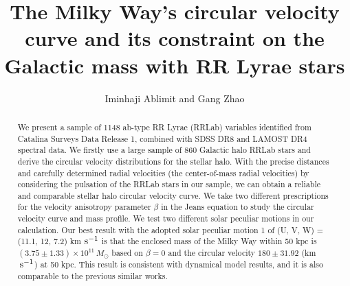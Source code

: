 \documentclass[12pt,preprint]{aastex}
\begin{document}


\title{ The Milky Way's circular velocity curve and its constraint
on the Galactic mass with RR Lyrae stars}
\author{Iminhaji Ablimit and Gang Zhao}



\begin{abstract}
We present a sample of 1148 ab-type RR Lyrae (RRLab) variables
identified from Catalina Surveys Data Release 1, combined with SDSS
DR8 and LAMOST DR4 spectral data. We firstly use a large sample of
860 Galactic halo RRLab stars and derive the circular velocity distributions for
the stellar halo. With the precise distances and carefully determined radial velocities
(the center-of-mass radial velocities) by considering the pulsation of the RRLab stars in our
sample, we can obtain a
reliable and comparable stellar halo circular velocity curve. We
take two different prescriptions for the velocity anisotropy parameter $\beta$
in the Jeans equation to study the circular velocity curve and mass profile. We test two different solar peculiar motions in our calculation. Our
best result with the adopted solar peculiar motion 1 of (U, V, W) =
(11.1, 12, 7.2) km ${\rm s}^{-1}$ is that the enclosed mass of the Milky Way within 50 kpc is
$(3.75\pm1.33)\times10^{11}\,M_\odot$ based on $\beta=0$ and the
circular velocity $180\pm31.92$ (km $\, \rm s^{-1}$) at 50 kpc. This
result is consistent with dynamical model results, and it is also
comparable to the previous similar works.

\end{abstract}
\end{document}
